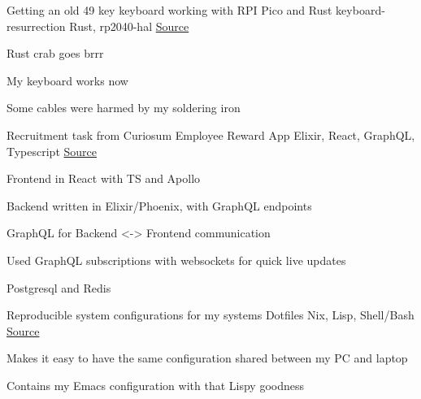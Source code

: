 

\begin{cventries}

  \cventry
    {Getting an old 49 key keyboard working with RPI Pico and Rust } %
    {keyboard-resurrection} %
    {Rust, rp2040-hal} %
    {\href{https://github.com/ravensiris/keyboard-resurrection}{\faGithubSquare\acvHeaderIconSep Source}} %
    {
      \begin{cvitems} %
        \item {Rust crab goes brrr}
        \item {My keyboard works now}
        \item {Some cables were harmed by my soldering iron}
      \end{cvitems}
    } %
  \cventry
    {Recruitment task from Curiosum} %
    {Employee Reward App} %
    {Elixir, React, GraphQL, Typescript} %
    {\href{https://github.com/ravensiris/employee-reward-app}{\faGithubSquare\acvHeaderIconSep Source}} %
    {
      \begin{cvitems} %
        \item {Frontend in React with TS and Apollo}
        \item {Backend written in Elixir/Phoenix, with GraphQL endpoints}
        \item {GraphQL for Backend <-> Frontend communication}
        \item {Used GraphQL subscriptions with websockets for quick live updates}
        \item {Postgresql and Redis}
      \end{cvitems}
    } %


  \cventry
    {Reproducible system configurations for my systems} %
    {Dotfiles} %
    {Nix, Lisp, Shell/Bash} %
    {\href{https://github.com/ravensiris/dotfiles}{\faGithubSquare\acvHeaderIconSep Source}} %
    {
      \begin{cvitems} %
        \item {Makes it easy to have the same configuration shared between my PC and laptop}
        \item {Contains my Emacs configuration with that Lispy goodness}
      \end{cvitems}
    } %


\end{cventries}
